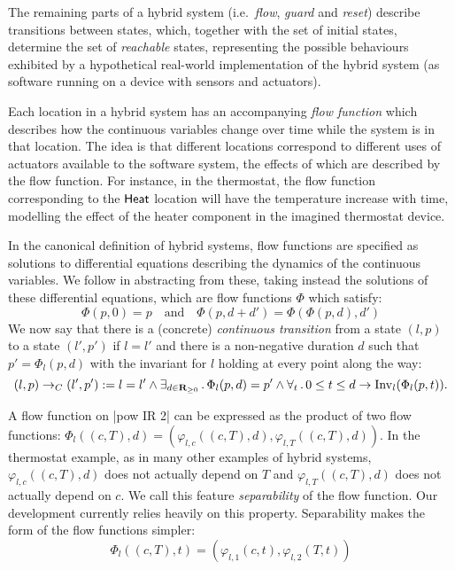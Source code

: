 \documentclass[runningheads]{llncs}
\newcommand{\Exists}[2]{\exists_{#1} \, . \, #2}
\newcommand{\Forall}[2]{\forall_{#1} \, . \, #2}
\def\phi{\varphi}
\newcommand{\IR}{{\mathbf R}}
\newcommand{\Heat}{{\sf Heat}}
\newcommand{\Inv}{{\rm Inv}}
\newcommand{\contrans}{\rightarrow_C}
\newcommand{\Dur}{{\IR_{\geq 0}}}
\begin{document}

The remaining parts of a hybrid system (i.e.\ {\em flow}, {\em guard}
and {\em reset}) describe transitions between states, which, together
with the set of initial states, determine the set of \emph{reachable}
states, representing the possible behaviours exhibited by a
hypothetical real-world implementation of the hybrid system (as
software running on a device with sensors and actuators).

Each location in a hybrid system has an accompanying \emph{flow function} which describes how the continuous variables change over
time while the system is in that location. The idea is that different locations correspond to different uses of actuators
available to the software system, the effects of which are described
by the flow function. For instance, in the thermostat, the flow
function corresponding to the $\Heat$ location will have the
temperature increase with time, modelling the effect of the heater
component in the imagined thermostat device.

In the canonical definition of hybrid systems, flow functions are
specified as solutions to differential equations describing the
dynamics of the continuous variables. We follow \cite{alur} in
abstracting from these, taking instead the solutions of these
differential equations, which are flow functions $\Phi$ which satisfy:
$$\Phi(p, 0) = p \quad \mbox{and} \quad \Phi (p, d + d') = \Phi (\Phi(p, d), d')$$
We now say that there is a (concrete) \emph{continuous transition}
from a state $(l, p)$ to a state $(l', p')$ if $l = l'$ and there is a
non-negative duration $d$ such that $p' = \Phi_l( p,d)$ with the
invariant for $l$ holding at every point along the way:
$$ (l,p) \contrans (l',p') := l=l' \wedge \Exists{d\in
\Dur}{\Phi_l(p, d) = p' \wedge \Forall{t}{0 \leq t\leq d \rightarrow
\Inv_l(\Phi_l (p, t))}}.$$

A flow function on |pow IR 2| can be expressed as the
product of two flow functions: $\Phi_l((c,T),d) = (\phi_{l,c}((c,T),d),
\phi_{l,T}((c,T),d))$. In the thermostat example, as in many other
examples of hybrid systems, $\phi_{l,c}((c,T),d)$ does not actually depend on $T$
and $\phi_{l,T}((c,T),d)$ does not actually depend on $c$. We call this feature
{\em separability\/} of the flow function. Our development currently
relies heavily on this property. Separability makes the form of the
flow functions simpler:
$$\Phi_l((c,T),t) = (\phi_{l,1}(c,t), \phi_{l,2}(T,t))$$
\end{document}
